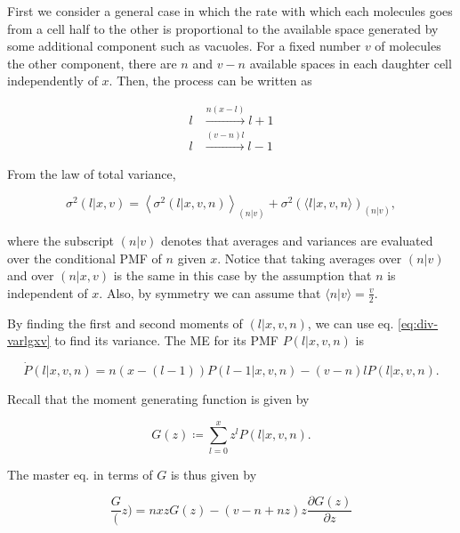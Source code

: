 First we consider a general case in which the rate with which each molecules goes from a cell half to the other is proportional to the available space generated by some additional component such as vacuoles. For a fixed number $v$ of molecules the other component, there are $n$ and $v-n$ available spaces in each daughter cell independently of $x$. Then, the process can be written as

\begin{equation}
  \label{eq:div-arr_disg}
  \begin{split}
    l&\xrightarrow{n(x-l)}l+1\\
    l&\xrightarrow{(v-n)l}l-1
  \end{split}
\end{equation}

From the law of total variance,

\begin{equation}
  \label{eq:div-varlgxv}
  \sigma^2(l|x,v) = \left\langle\sigma^2(l|x,v,n)\right\rangle_{(n|v)}+\sigma^2\left(\langle l|x,v,n\rangle\right)_{(n|v)},
\end{equation}

where the subscript $(n|v)$ denotes that averages and variances are evaluated over the conditional PMF of $n$ given $x$. Notice that taking averages over $(n|v)$ and over $(n|x,v)$ is the same in this case by the assumption that $n$ is independent of $x$. Also, by symmetry we can assume that $\langle n|v\rangle = \frac{v}{2}$.

By finding the first and second moments of $(l|x,v,n)$, we can use eq. \eqref{eq:div-varlgxv} to find its variance. The ME for its PMF $P(l|x,v,n)$ is

\begin{equation*}
  \dot{P}(l|x,v,n) = n(x-(l-1))P(l-1|x,v,n) - (v-n)lP(l|x,v,n).
\end{equation*}

Recall that the moment generating function is given by

\begin{equation}
  \label{eq:div-Gdef}
  G(z) \coloneqq \sum_{l=0}^xz^lP(l|x,v,n).
\end{equation}

The master eq. in terms of $G$ is thus given by

\begin{equation*}
  \frac{G}(z) = nxzG(z) - (v-n+nz)z\frac{\partial G(z)}{\partial z}
\end{equation*}

